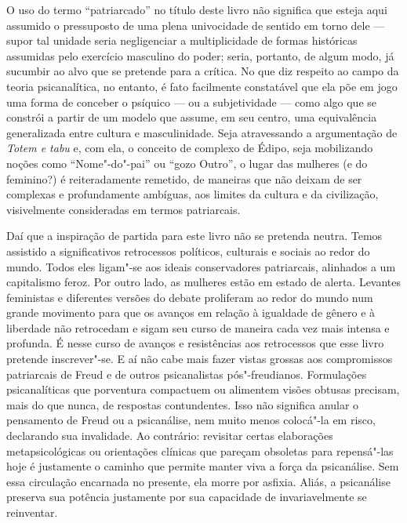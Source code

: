 O uso do termo ``patriarcado'' no título deste livro não significa que
esteja aqui assumido o pressuposto de uma plena univocidade de sentido
em torno dele --- supor tal unidade seria negligenciar a multiplicidade
de formas históricas assumidas pelo exercício masculino do poder; seria,
portanto, de algum modo, já sucumbir ao alvo que se pretende para a
crítica. No que diz respeito ao campo da teoria psicanalítica, no
entanto, é fato facilmente constatável que ela põe em jogo uma forma de
conceber o psíquico --- ou a subjetividade --- como algo que se constrói a
partir de um modelo que assume, em seu centro, uma equivalência
generalizada entre cultura e masculinidade. Seja atravessando a
argumentação de \emph{Totem e tabu} e, com ela, o conceito de complexo de
Édipo, seja mobilizando noções como ``Nome"-do"-pai'' ou ``gozo Outro'', o
lugar das mulheres (e do feminino?) é reiteradamente remetido, de
maneiras que não deixam de ser complexas e profundamente ambíguas, aos
limites da cultura e da civilização, visivelmente consideradas em termos
patriarcais.

Daí que a inspiração de partida para este livro não se pretenda neutra.
Temos assistido a significativos retrocessos políticos, culturais e
sociais ao redor do mundo. Todos eles ligam"-se aos ideais conservadores
patriarcais, alinhados a um capitalismo feroz. Por outro lado, as
mulheres estão em estado de alerta. Levantes feministas e diferentes
versões do debate proliferam ao redor do mundo num grande movimento para
que os avanços em relação à igualdade de gênero e à liberdade não
retrocedam e sigam seu curso de maneira cada vez mais intensa e
profunda. É nesse curso de avanços e resistências aos retrocessos que
esse livro pretende inscrever"-se. E aí não cabe mais fazer vistas
grossas aos compromissos patriarcais de Freud e de outros psicanalistas
pós"-freudianos. Formulações psicanalíticas que porventura compactuem ou alimentem visões obtusas precisam, mais do que nunca, de respostas contundentes. Isso não significa anular o pensamento de Freud ou a psicanálise, nem muito menos colocá"-la em risco, declarando sua
invalidade. Ao contrário: revisitar certas elaborações metapsicológicas
ou orientações clínicas que pareçam obsoletas para repensá"-las hoje é
justamente o caminho que permite manter viva a força da
psicanálise. Sem essa circulação encarnada no presente, ela morre por
asfixia. Aliás, a psicanálise preserva sua potência justamente por sua
capacidade de invariavelmente se reinventar.

